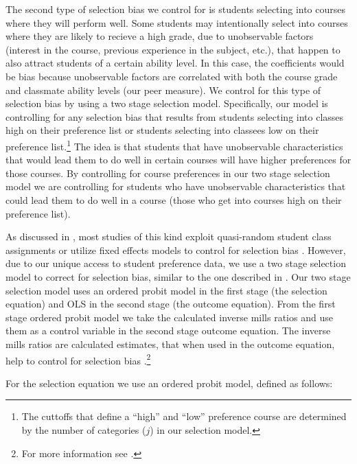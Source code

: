 The second type of selection bias we control for is students selecting into courses where they will perform well. 
Some students may intentionally select into courses where they are likely to recieve a high grade, due to unobservable factors (interest in the course, previous experience in the subject, etc.), that happen to also attract students of a certain ability level.
In this case, the coefficients would be bias because unobservable factors are correlated with both the course grade and classmate ability levels (our peer measure). 
We control for this type of selection bias by using a two stage selection model.
Specifically, our model is controlling for any selection bias that results from students selecting into classes high on their preference list or students selecting into classees low on their preference list.\footnote{The cuttoffs that define a ``high'' and ``low'' preference course are determined by the number of categories ($j$) in our selection model.} 
The idea is that students that have unobservable characteristics that would lead them to do well in certain courses will have higher preferences for those courses.
By controlling for course preferences in our two stage selection model we are controlling for students who have unobservable characteristics that could lead them to do well in a course (those who get into courses high on their preference list).

As discussed in , most studies of this kind exploit quasi-random student class assignments or utilize fixed effects models to control for selection bias \citep{kang2007classroom,carman2012classroom,schlosser2008inside,lavy2012good}. 
However, due to our unique access to student preference data, we use a two stage selection model to correct for selection bias, similar to the one described in \citet{heckman1979sample}. 
Our two stage selection model uses an ordered probit model in the first stage (the selection equation) and OLS in the second stage (the outcome equation). 
From the first stage ordered probit model we take the calculated inverse mills ratios and use them as a control variable in the second stage outcome equation. 
The inverse mills ratios are calculated estimates, that when used in the outcome equation, help to control for selection bias \citep{heckman1979sample}.\footnote{For more information see \citet{greene2002limdep}.}

For the selection equation we use an ordered probit model, defined as follows:

\setlength{\belowdisplayskip}{5pt} \setlength{\belowdisplayshortskip}{1pt}
\setlength{\abovedisplayskip}{-6pt} \setlength{\abovedisplayshortskip}{1pt}

